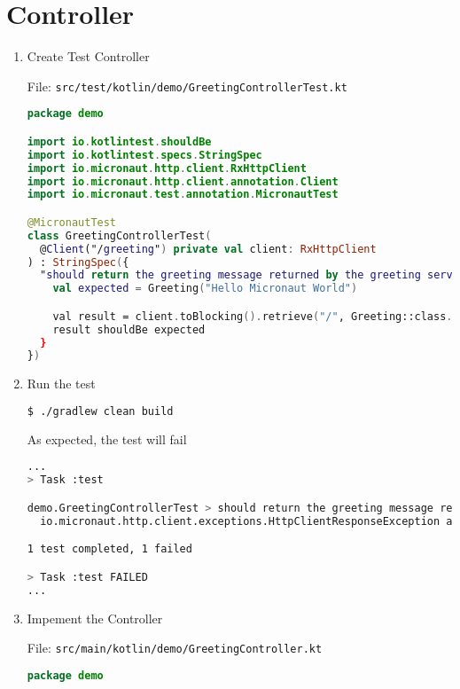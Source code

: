 \section{Controller}\label{sec:controller}

\begin{enumerate}

\item  Create Test Controller

File: \texttt{src/test/kotlin/demo/GreetingControllerTest.kt}

\begin{lstlisting}[language=Kotlin]
package demo

import io.kotlintest.shouldBe
import io.kotlintest.specs.StringSpec
import io.micronaut.http.client.RxHttpClient
import io.micronaut.http.client.annotation.Client
import io.micronaut.test.annotation.MicronautTest

@MicronautTest
class GreetingControllerTest(
  @Client("/greeting") private val client: RxHttpClient
) : StringSpec({
  "should return the greeting message returned by the greeting service" {
    val expected = Greeting("Hello Micronaut World")

    val result = client.toBlocking().retrieve("/", Greeting::class.java)
    result shouldBe expected
  }
})
\end{lstlisting}

\item Run the test

\begin{lstlisting}[language=bash]
$ ./gradlew clean build
\end{lstlisting}

As expected, the test will fail

\begin{lstlisting}[language=bash]
...
> Task :test

demo.GreetingControllerTest > should return the greeting message returned by the greeting service FAILED
  io.micronaut.http.client.exceptions.HttpClientResponseException at DefaultHttpClient.java:2030

1 test completed, 1 failed

> Task :test FAILED
...
\end{lstlisting}

\item Impement the Controller

File: \texttt{src/main/kotlin/demo/GreetingController.kt}

\begin{lstlisting}[language=Kotlin]
package demo


\end{lstlisting}
\end{enumerate}

